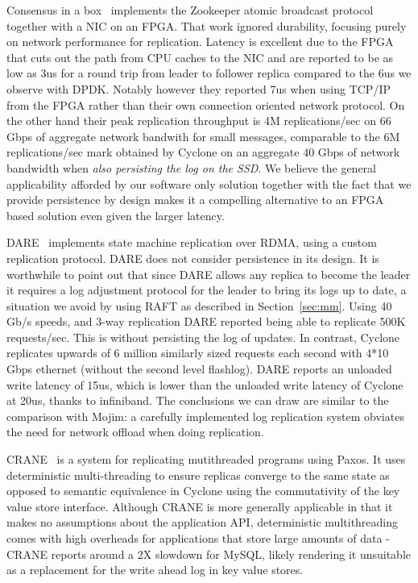 \documentclass[pageno]{jpaper}
\begin{document}
Consensus in a box~\cite{consensus_box} implements the Zookeeper atomic
broadcast protocol together with a NIC on an FPGA. That work ignored durability,
focusing purely on network performance for replication. Latency is excellent due
to the FPGA that cuts out the path from CPU caches to the NIC and are reported
to be as low as 3us for a round trip from leader to follower replica compared to
the 6us we observe with DPDK. Notably however they reported 7us when using
TCP/IP from the FPGA rather than their own connection oriented network
protocol. On the other hand their peak replication throughput is 4M
replications/sec on 66 Gbps of aggregate network bandwith for small messages,
comparable to the 6M replications/sec mark obtained by Cyclone on an aggregate
40 Gbps of network bandwidth when \emph{also persisting the log on the SSD}. We
believe the general applicability afforded by our software only solution
together with the fact that we provide persistence by design makes it a
compelling alternative to an FPGA based solution even given the larger latency.

DARE~\cite{dare} implements state machine replication over RDMA, using a custom
replication protocol. DARE does not consider persistence in its design. It is
worthwhile to point out that since DARE allows any replica to become the leader
it requires a log adjustment protocol for the leader to bring its logs up to
date, a situation we avoid by using RAFT as described in
Section~\ref{sec:mm}. Using 40 Gb/s speeds, and 3-way replication DARE reported
being able to replicate 500K requests/sec. This is without persisting the log of
updates. In contrast, Cyclone replicates upwards of 6 million similarly sized
requests each second with 4*10 Gbps ethernet (without the second level
flashlog). DARE reports an unloaded write latency of 15us, which is lower than
the unloaded write latency of Cyclone at 20us, thanks to infiniband. The
conclusions we can draw are similar to the comparison with Mojim: a carefully
implemented log replication system obviates the need for network offload when
doing replication.

{CRANE}~\cite{crane} is a system for replicating mutithreaded programs using
Paxos. It uses deterministic multi-threading to ensure replicas converge to the
same state as opposed to semantic equivalence in Cyclone using the commutativity
of the key value store interface. Although CRANE is more generally applicable in
that it makes no assumptions about the application API, deterministic
multithreading comes with high overheads for applications that store large
amounts of data - CRANE reports around a 2X slowdown for MySQL, likely rendering
it unsuitable as a replacement for the write ahead log in key value stores.
\end{document}
